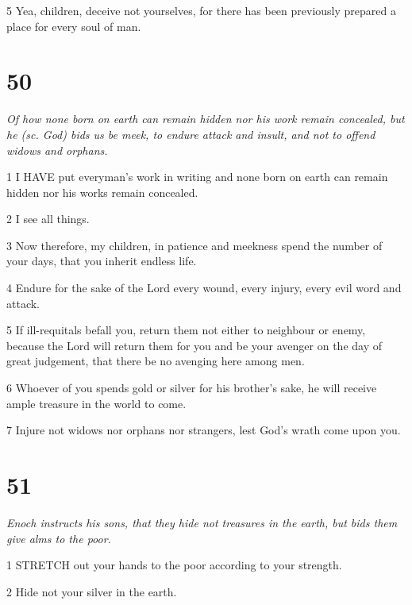 \par 5 Yea, children, deceive not yourselves, for there has been previously prepared a place for every soul of man.

\chapter{50}

\par \textit{Of how none born on earth can remain hidden nor his work remain concealed, but he (sc. God) bids us be meek, to endure attack and insult, and not to offend widows and orphans.}

\par 1 I HAVE put everyman's work in writing and none born on earth can remain hidden nor his works remain concealed.

\par 2 I see all things.

\par 3 Now therefore, my children, in patience and meekness spend the number of your days, that you inherit endless life.

\par 4 Endure for the sake of the Lord every wound, every injury, every evil word and attack.

\par 5 If ill-requitals befall you, return them not either to neighbour or enemy, because the Lord will return them for you and be your avenger on the day of great judgement, that there be no avenging here among men.

\par 6 Whoever of you spends gold or silver for his brother's sake, he will receive ample treasure in the world to come.

\par 7 Injure not widows nor orphans nor strangers, lest God's wrath come upon you.

\chapter{51}

\par \textit{Enoch instructs his sons, that they hide not treasures in the earth, but bids them give alms to the poor.}

\par 1 STRETCH out your hands to the poor according to your strength.

\par 2 Hide not your silver in the earth.

